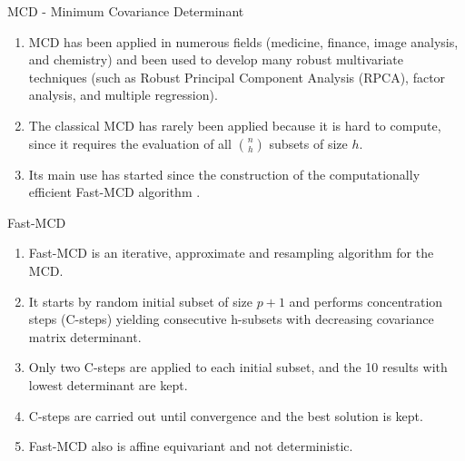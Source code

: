 \documentclass[newPxFont, numfooter, sectionpages]{beamer}
\begin{document}
\begin{frame}[c]{MCD - Minimum Covariance Determinant}
	\begin{enumerate}
		\item MCD has been applied in numerous fields (medicine, finance, image analysis, and chemistry) and been used to develop many robust multivariate techniques (such as Robust Principal Component Analysis (RPCA), factor analysis, and multiple regression).
		\item The classical MCD has rarely been applied because it is hard to compute, since it requires the evaluation of all $\binom{n}{h}$ subsets of size $h$. %
		\item Its main use has started since the construction of the computationally efficient Fast-MCD algorithm \cite{rousseeuw1999fast}.
	\end{enumerate}
\end{frame}

\begin{frame}[c]{Fast-MCD}
	\begin{enumerate}
		\item Fast-MCD is an iterative, approximate and resampling algorithm for the MCD.
		\item It starts by random initial subset of size $p+1$ and performs concentration steps (C-steps) yielding consecutive h-subsets with decreasing covariance matrix determinant.
		\item Only two C-steps are applied to each initial subset, and the 10 results with lowest determinant are kept.
		\item C-steps are carried out until convergence and the best solution is kept.
		\item Fast-MCD also is affine equivariant and not deterministic.
	\end{enumerate}
\end{frame}
\end{document}
